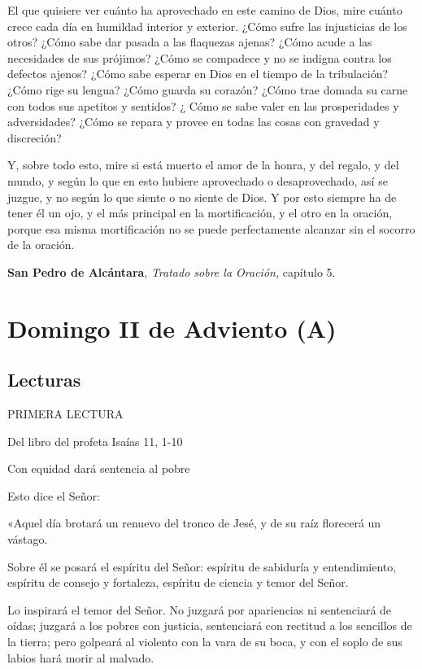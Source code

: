 El que quisiere ver cuánto ha aprovechado en este camino de Dios, mire cuánto crece cada día en humildad interior y exterior. ¿Cómo sufre las injusticias de los otros? ¿Cómo sabe dar pasada a las flaquezas ajenas? ¿Cómo acude a las necesidades de sus prójimos? ¿Cómo se compadece y no se indigna contra los defectos ajenos? ¿Cómo sabe esperar en Dios en el tiempo de la tribulación? ¿Cómo rige su lengua? ¿Cómo guarda su corazón? ¿Cómo trae domada su carne con todos sus apetitos y sentidos? ¿ Cómo se sabe valer en las prosperidades y adversidades? ¿Cómo se repara y provee en todas las cosas con gravedad y discreción?

Y, sobre todo esto, mire si está muerto el amor de la honra, y del regalo, y del mundo, y según lo que en esto hubiere aprovechado o desaprovechado, así se juzgue, y no según lo que siente o no siente de Dios. Y por esto siempre ha de tener él un ojo, y el más principal en la mortificación, y el otro en la oración, porque esa misma mortificación no se puede perfectamente alcanzar sin el socorro de la oración.

\textbf{San Pedro de Alcántara}, \emph{Tratado sobre la Oración,} capítulo 5.

\chapter{Domingo II de Adviento (A)}

\section{Lecturas}

PRIMERA LECTURA

Del libro del profeta Isaías 11, 1-10

Con equidad dará sentencia al pobre

Esto dice el Señor:

«Aquel día brotará un renuevo del tronco de Jesé, y de su raíz florecerá
un vástago.

Sobre él se posará el espíritu del Señor: espíritu de sabiduría y
entendimiento, espíritu de consejo y fortaleza, espíritu de ciencia y
temor del Señor.

Lo inspirará el temor del Señor. No juzgará por apariencias ni
sentenciará de oídas; juzgará a los pobres con justicia, sentenciará con
rectitud a los sencillos de la tierra; pero golpeará al violento con la
vara de su boca, y con el soplo de sus labios hará morir al malvado.


